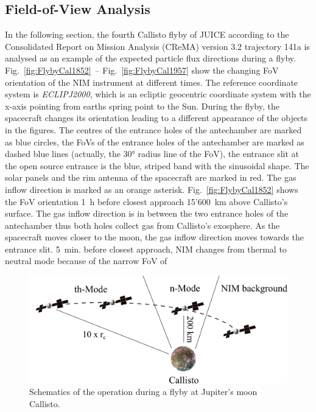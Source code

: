 	
	\subsection{Field-of-View Analysis}\label{subsubsec:Calfly}

	In the following section, the fourth Callisto flyby of JUICE according to the Consolidated Report on Mission Analysis (CReMA) version 3.2 trajectory 141a \cite{SOC_Crema3p2} is analysed as an example of the expected particle flux directions during a flyby. Fig.~\ref{fig:FlybyCal1852}~-- Fig.~\ref{fig:FlybyCal1957} show the changing FoV orientation of the NIM instrument at different times. The reference coordinate system is \textit{ECLIPJ2000}, which is an ecliptic geocentric coordinate system with the x-axis pointing from earths spring point to the Sun. During the flyby, the spacecraft changes its orientation leading to a different appearance of the objects in the figures. The centres of the entrance holes of the antechamber are marked as blue circles, the FoVs of the entrance holes of the antechamber are marked as dashed blue lines (actually, the 30° radius line of the FoV), the entrance slit at the open source entrance is the blue, striped band with the sinusoidal shape. The solar panels and the rim antenna of the spacecraft are marked in red. The gas inflow direction is marked as an orange asterisk. Fig.~\ref{fig:FlybyCal1852} shows the FoV orientation 1~h before closest approach 15'600~km above Callisto's surface. The gas inflow direction is in between the two entrance holes of the antechamber thus both holes collect gas from Callisto's exosphere. As the spacecraft moves closer to the moon, the gas inflow direction moves towards the entrance slit. 5~min. before closest approach, NIM changes from thermal to neutral mode because of the narrow FoV of 
	\begin{figure}[H]
		\centering
		\includegraphics[width=.8\textwidth]{Bilder/Callisto_flyby_schematic.png}
		\caption{Schematics of the operation during a flyby at Jupiter's moon Callisto.}
		\label{fig:CalflybySchem}
	\end{figure}
